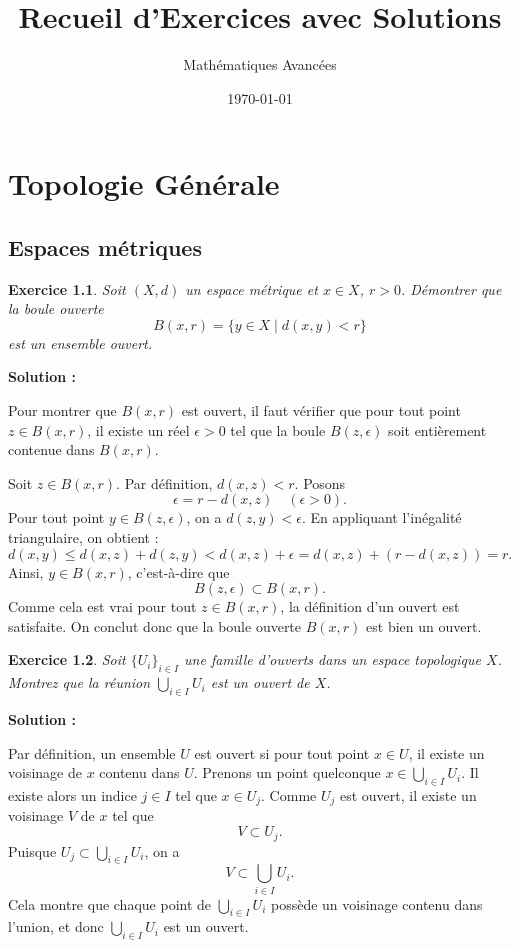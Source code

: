 \documentclass[11pt,twoside,openany]{book}
\newtheorem{exercice}{Exercice}[chapter]%
\newenvironment{solution}{\par\textbf{Solution :}\par\small}{\normalsize\par}
\begin{document}
\frontmatter
\title{Recueil d'Exercices avec Solutions}
\author{Mathématiques Avancées}
\date{\today}
\maketitle

\tableofcontents

\mainmatter %

\chapter{Topologie Générale}
\section{Espaces métriques}

\begin{exercice}
Soit $(X,d)$ un espace métrique et $x \in X$, $r > 0$. Démontrer que la boule ouverte 
$$B(x,r) = \{ y \in X \mid d(x,y) < r \}$$ 
est un ensemble ouvert.
\end{exercice}

\begin{solution}
Pour montrer que $B(x,r)$ est ouvert, il faut vérifier que pour tout point $z \in B(x,r)$, il existe un réel $\epsilon > 0$ tel que la boule $B(z,\epsilon)$ soit entièrement contenue dans $B(x,r)$.

\medskip %

Soit $z \in B(x,r)$. Par définition, $d(x,z) < r$. Posons 
\[
\epsilon = r - d(x,z) \quad (\epsilon > 0).
\]
Pour tout point $y \in B(z,\epsilon)$, on a $d(z,y) < \epsilon$. En appliquant l'inégalité triangulaire, on obtient :
\[
d(x,y) \leq d(x,z) + d(z,y) < d(x,z) + \epsilon = d(x,z) + (r - d(x,z)) = r.
\]
Ainsi, $y \in B(x,r)$, c'est-à-dire que
\[
B(z,\epsilon) \subset B(x,r).
\]
Comme cela est vrai pour tout $z \in B(x,r)$, la définition d'un ouvert est satisfaite. On conclut donc que la boule ouverte $B(x,r)$ est bien un ouvert.
\end{solution}

\begin{exercice}
Soit $\{ U_i \}_{i \in I}$ une famille d'ouverts dans un espace topologique $X$. Montrez que la réunion $\bigcup_{i\in I} U_i$ est un ouvert de $X$.
\end{exercice}

\begin{solution}
Par définition, un ensemble $U$ est ouvert si pour tout point $x \in U$, il existe un voisinage de $x$ contenu dans $U$. Prenons un point quelconque $x \in \bigcup_{i\in I} U_i$. Il existe alors un indice $j \in I$ tel que $x \in U_j$. Comme $U_j$ est ouvert, il existe un voisinage $V$ de $x$ tel que
\[
V \subset U_j.
\]
Puisque $U_j \subset \bigcup_{i\in I} U_i$, on a
\[
V \subset \bigcup_{i\in I} U_i.
\]
Cela montre que chaque point de $\bigcup_{i\in I} U_i$ possède un voisinage contenu dans l'union, et donc $\bigcup_{i\in I} U_i$ est un ouvert.
\end{solution}
\end{document}
